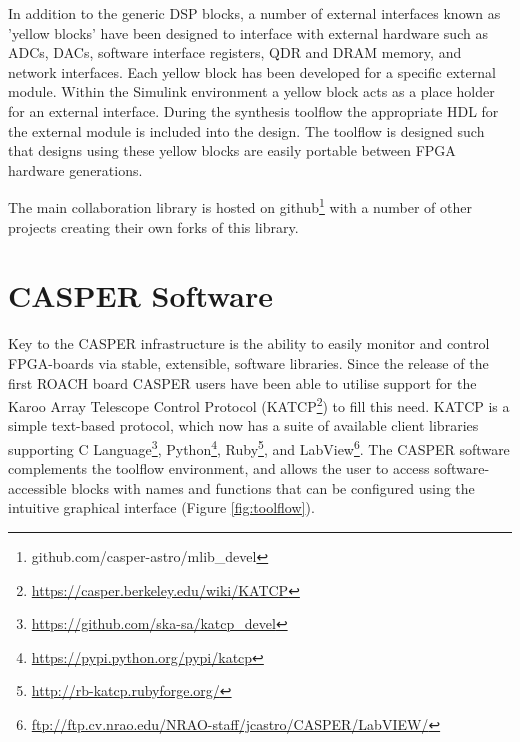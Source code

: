 \documentclass{ws-jai}
\begin{document}
In addition to the generic DSP blocks, a number of external interfaces known as
'yellow blocks' have been designed to interface with external hardware such as
ADCs, DACs, software interface registers, QDR  and DRAM memory, and network
interfaces. Each yellow block has been developed for a specific external module.
Within the Simulink environment a yellow block acts as a place holder for an
external interface. During the synthesis toolflow the appropriate HDL for the
external module is included into the design. The toolflow is designed such that designs using these yellow blocks are easily portable between FPGA hardware generations.

The main collaboration library is hosted on
github\footnote{github.com/casper-astro/mlib\_devel} with a number of
other projects creating their own forks of this library.

\section{CASPER Software} \label{sec:Software}
Key to the CASPER infrastructure is the ability to easily monitor and control
FPGA-boards via stable, extensible, software libraries. Since the release of the
first ROACH board CASPER users have been able to utilise support for the Karoo
Array Telescope Control Protocol
(KATCP\footnote{\url{https://casper.berkeley.edu/wiki/KATCP}}) to fill this
need. KATCP is a simple text-based protocol, which now has a suite of available
client libraries supporting C Language\footnote{\url{https://github.com/ska-sa/katcp_devel}}, Python\footnote{\url{https://pypi.python.org/pypi/katcp}}, Ruby\footnote{\url{http://rb-katcp.rubyforge.org/}}, and LabView\footnote{\url{ftp://ftp.cv.nrao.edu/NRAO-staff/jcastro/CASPER/LabVIEW/}}.
The CASPER software complements the toolflow environment, and allows the user to access software-accessible blocks with names and functions that can be configured using the intuitive graphical interface (Figure \ref{fig:toolflow}). 
\end{document}
